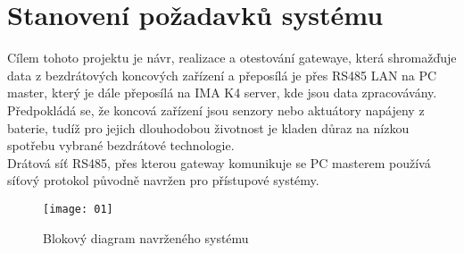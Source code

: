 \chapter{Stanovení požadavků systému}

Cílem tohoto projektu je návr, realizace a otestování gatewaye, která shromažďuje data z bezdrátových koncových zařízení a přeposílá je přes RS485 LAN na PC master, který je dále přeposílá na IMA K4 server, kde jsou data zpracovávány.
\\
Předpokládá se, že koncová zařízení jsou senzory nebo aktuátory napájeny z baterie, tudíž pro jejich dlouhodobou životnost je kladen důraz na nízkou spotřebu vybrané bezdrátové technologie.
\\
Drátová síť RS485, přes kterou gateway komunikuje se PC masterem používá síťový protokol původně navržen pro přístupové systémy. 

\begin{figure}[!h]
    \centering
    \texttt{[image: 01]}
    \caption{Blokový diagram navrženého systému}
    \label{fig:block diagram of the system}
\end{figure}

